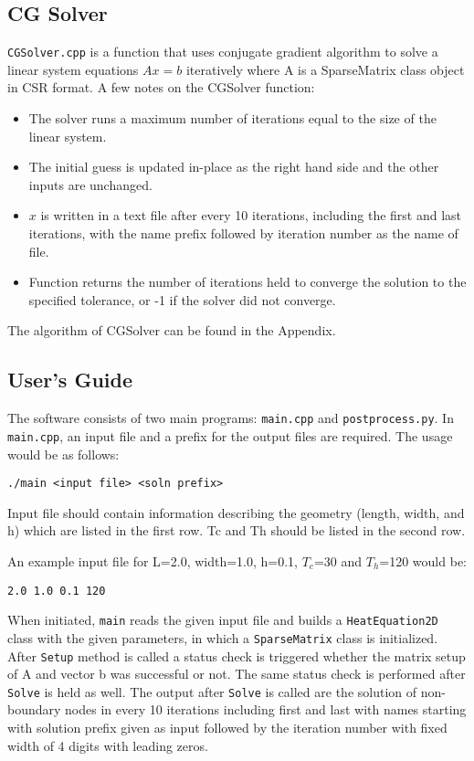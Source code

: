 \documentclass[10pt]{article}
\begin{document}
\subsection*{CG Solver}
\texttt{CGSolver.cpp} is a function that uses conjugate gradient algorithm \cite{p1} to solve a linear system equations $Ax=b$ iteratively where A is a SparseMatrix class object in CSR format. A few notes on the CGSolver function:
\begin{itemize}
    \item The solver runs a maximum number of iterations equal to the size of the linear system.
    \item The initial guess is updated in-place as the right hand side and the other inputs are unchanged.
    \item $x$ is written in a text file after every 10 iterations, including the first and last iterations, with the name prefix followed by iteration number as the name of file.
    \item Function returns the number of iterations held to converge the solution to the specified tolerance, or -1 if the solver did not converge. 
\end{itemize}
  
The algorithm of CGSolver can be found in the Appendix.

\subsection*{User's Guide}

The software consists of two main programs: \texttt{main.cpp} and \texttt{postprocess.py}. In \texttt{main.cpp}, an input file and a prefix for the output files are required. The usage would be as follows:

    \texttt{./main <input file> <soln prefix>}

Input file should contain information describing the geometry (length, width, and h) which are listed in the first row. Tc and Th should be listed in the second row.

An example input file for L=2.0, width=1.0, h=0.1, $T_c$=30 and $T_h$=120  would be:

\texttt{2.0 1.0 0.1 120}

When initiated, \texttt{main} reads the given input file and builds a \texttt{HeatEquation2D} class with the given parameters, in which a \texttt{SparseMatrix} class is initialized. After \texttt{Setup} method is called a status check is triggered whether the matrix setup of A and vector b was successful or not.  The same status check is performed after \texttt{Solve} is held as well. The output after \texttt{Solve} is called are the solution of non-boundary nodes in every 10 iterations including first and last with names starting with solution prefix given as input followed by the iteration number with fixed width of 4 digits with leading zeros.
\end{document}

